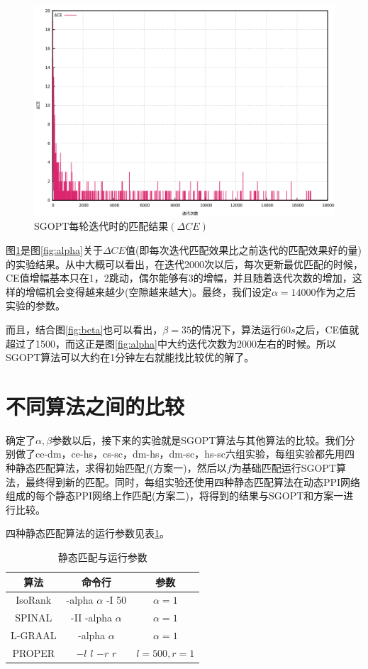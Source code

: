 \begin{figure}[htbp]
\centering
\includegraphics[height=0.4\textheight]{pic/alpha_d.png}
\caption{SGOPT每轮迭代时的匹配结果$(\Delta CE)$} 
\label{fig:alpha_d}
\end{figure}

图\ref{fig:alpha_d}是图\ref{fig:alpha}关于$\Delta CE$值(即每次迭代匹配效果比之前迭代的匹配效果好的量)的实验结果。从中大概可以看出，在迭代2000次以后，每次更新最优匹配的时候，CE值增幅基本只在1，2跳动，偶尔能够有3的增幅，并且随着迭代次数的增加，这样的增幅机会变得越来越少(空隙越来越大)。最终，我们设定$\alpha=14000$作为之后实验的参数。

而且，结合图\ref{fig:beta}也可以看出，$\beta=35$的情况下，算法运行$60s$之后，CE值就超过了1500，而这正是图\ref{fig:alpha}中大约迭代次数为2000左右的时候。所以SGOPT算法可以大约在1分钟左右就能找比较优的解了。

\section{不同算法之间的比较}

确定了$\alpha,\beta$参数以后，接下来的实验就是SGOPT算法与其他算法的比较。我们分别做了ce-dm，ce-hs，cs-sc，dm-hs，dm-sc，hs-sc六组实验，每组实验都先用四种静态匹配算法，求得初始匹配$f$(方案一)，然后以$f$为基础匹配运行SGOPT算法，最终得到新的匹配。同时，每组实验还使用四种静态匹配算法在动态PPI网络组成的每个静态PPI网络上作匹配(方案二)，将得到的结果与SGOPT和方案一进行比较。

四种静态匹配算法的运行参数见表\ref{table:3}。

\begin{table}[htbp]
    \centering
    \caption{静态匹配与运行参数}
    \label{table:3}
    \begin{tabular}{ccc}
         \hline 算法&命令行&参数\\
         \hline IsoRank&-alpha $\alpha$ -I 50&$\alpha=1$\\
         SPINAL&-II -alpha $\alpha$&$\alpha=1$\\
         L-GRAAL&-alpha $\alpha$&$\alpha=1$\\
         PROPER&$-l$ $l$ $-r$ $r$&$l=500,r=1$\\
         \hline
    \end{tabular}
\end{table}

